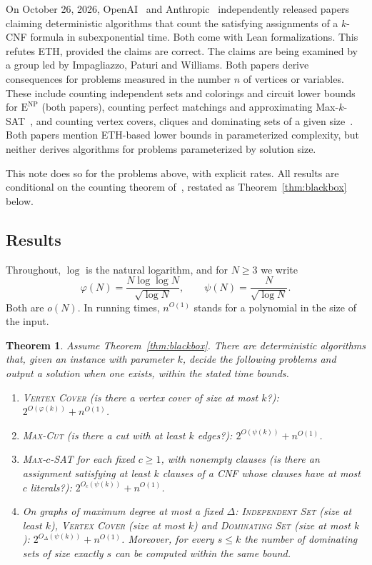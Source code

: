 \documentclass[11pt]{amsart}
\newtheorem{theorem}{Theorem}[section]
\theoremstyle{definition}
\theoremstyle{remark}
\newcommand{\VC}{\textup{\textsc{Vertex Cover}}}
\newcommand{\MC}{\textup{\textsc{Max-Cut}}}
\newcommand{\MS}{\textup{\textsc{Max-$c$-SAT}}}
\newcommand{\IS}{\textup{\textsc{Independent Set}}}
\newcommand{\DS}{\textup{\textsc{Dominating Set}}}
\begin{document}
On October 26, 2026, OpenAI~\cite{Ope26} and Anthropic~\cite{Cla26} independently released papers claiming deterministic algorithms that count the satisfying assignments of a $k$-CNF formula in subexponential time. Both come with Lean formalizations. This refutes ETH, provided the claims are correct. The claims are being examined by a group led by Impagliazzo, Paturi and Williams. Both papers derive consequences for problems measured in the number $n$ of vertices or variables. These include counting independent sets and colorings and circuit lower bounds for $\mathrm{E}^{\mathrm{NP}}$ (both papers), counting perfect matchings and approximating Max-$k$-SAT~\cite{Ope26}, and counting vertex covers, cliques and dominating sets of a given size~\cite{Cla26}. Both papers mention ETH-based lower bounds in parameterized complexity, but neither derives algorithms for problems parameterized by solution size.

This note does so for the problems above, with explicit rates. All results are conditional on the counting theorem of~\cite{Ope26,Cla26}, restated as Theorem~\ref{thm:blackbox} below.

\subsection{Results}

Throughout, $\log$ is the natural logarithm, and for $N\ge 3$ we write
\[
\varphi(N)=\frac{N\log\log N}{\sqrt{\log N}},\qquad \psi(N)=\frac{N}{\sqrt{\log N}}.
\]
Both are $o(N)$. In running times, $n^{O(1)}$ stands for a polynomial in the size of the input.

\begin{theorem}\label{thm:main}
Assume Theorem~\ref{thm:blackbox}. There are deterministic algorithms that, given an instance with parameter $k$, decide the following problems and output a solution when one exists, within the stated time bounds.
\begin{enumerate}[label=(\alph*)]
\item \VC{} (is there a vertex cover of size at most $k$?): $2^{O(\varphi(k))}+n^{O(1)}$.
\item \MC{} (is there a cut with at least $k$ edges?): $2^{O(\psi(k))}+n^{O(1)}$.
\item \MS{} for each fixed $c\ge 1$, with nonempty clauses (is there an assignment satisfying at least $k$ clauses of a CNF whose clauses have at most $c$ literals?): $2^{O_c(\psi(k))}+n^{O(1)}$.
\item On graphs of maximum degree at most a fixed $\Delta$: \IS{} (size at least $k$), \VC{} (size at most $k$) and \DS{} (size at most $k$): $2^{O_\Delta(\psi(k))}+n^{O(1)}$. Moreover, for every $s\le k$ the number of dominating sets of size exactly $s$ can be computed within the same bound.
\end{enumerate}
\end{theorem}
\end{document}
